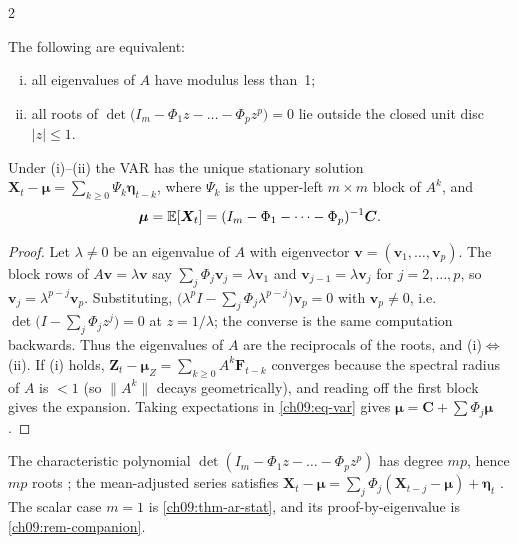 \begin{paracol}{2}
\begin{proposition}\label{ch09:prop-companion}
The following are equivalent:
\begin{enumerate}[(i)]
  \item all eigenvalues of $A$ have modulus less than~1;
  \item all roots of
      $\det\bigl(I_m-\Phi_1z-\dots-\Phi_pz^p\bigr)=0$ lie outside the closed unit disc $|z|\le1$.
\end{enumerate}
Under (i)--(ii) the VAR has the unique
stationary solution $\bm X_t-\bm\mu=\sum_{k\ge0}\Psi_k\bm\eta_{t-k}$, where $\Psi_k$ is the upper-left $m\times m$ block of $A^k$, and
\begin{equation}\label{ch09:eq-varmean}
\bm\mu=\mathbb{E}[\bm X_t]=(I_m-\Phi_1-\dots-\Phi_p)^{-1}\bm C .
\end{equation}
\end{proposition}
\begin{proof}
Let $\lambda\ne0$ be an eigenvalue of $A$ with eigenvector $\bm v=(\bm v_1,\dots,\bm v_p)$. The block rows of $A\bm v=\lambda\bm v$
say $\sum_j\Phi_j\bm v_j=\lambda\bm v_1$ and $\bm v_{j-1}=\lambda\bm v_j$ for $j=2,\dots,p$, so $\bm v_j=\lambda^{p-j}\bm v_p$. Substituting,
$\bigl(\lambda^pI-\sum_j\Phi_j\lambda^{p-j}\bigr)\bm v_p=0$ with $\bm v_p\ne0$, i.e.\ $\det\bigl(I-\sum_j\Phi_jz^j\bigr)=0$ at $z=1/\lambda$;
the converse is the same computation backwards. Thus the eigenvalues of $A$ are the reciprocals of the roots, and (i)$\Leftrightarrow$(ii).
If (i) holds, $\bm Z_t-\bm\mu_Z=\sum_{k\ge0}A^k\bm F_{t-k}$ converges because the spectral radius of $A$ is $<1$ (so $\|A^k\|$ decays
geometrically), and reading off the first block gives the expansion. Taking expectations in \eqref{ch09:eq-var} gives $\bm\mu=\bm C+\sum\Phi_j\bm\mu$.
\end{proof}
The characteristic polynomial $\det(I_m-\Phi_1z-\dots-\Phi_pz^p)$ has degree $mp$, hence $mp$ roots
; the mean-adjusted series satisfies $\bm X_t-\bm\mu=\sum_j\Phi_j(\bm X_{t-j}-\bm\mu)+\bm\eta_t$
. The scalar case $m=1$ is \cref{ch09:thm-ar-stat}, and its proof-by-eigenvalue is
\cref{ch09:rem-companion}.


\end{paracol}
